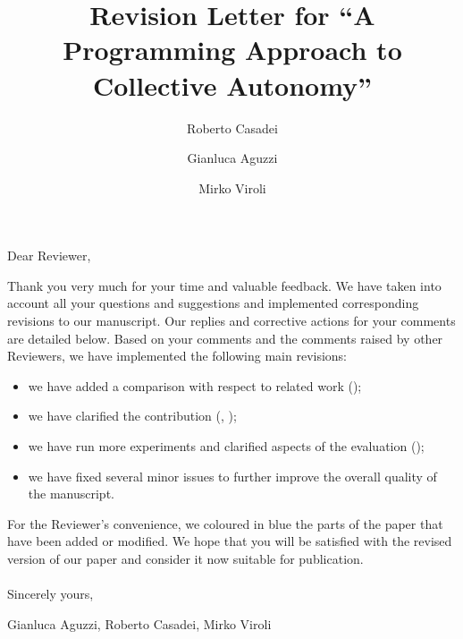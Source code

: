 \title{{\Large Revision Letter for} ``A Programming Approach to Collective Autonomy''}
\author{
Roberto Casadei
\and
Gianluca Aguzzi
\and
Mirko Viroli
}

\maketitle

Dear Reviewer, \newline

Thank you very much for your time and valuable feedback.
%
We have taken into account all your questions and suggestions and implemented corresponding revisions to our manuscript.
%
Our replies and corrective actions for your comments are detailed below.
%
Based on your comments and the comments raised by other Reviewers, we have implemented the following main revisions:
%
\begin{itemize}
\item we have added a comparison with respect to related work ();
\item we have clarified the contribution
(, );
\item we have run more experiments and clarified aspects of the evaluation ();
\item we have fixed several minor issues to further improve the overall quality of the manuscript.
\end{itemize}
%
For the Reviewer's convenience, we coloured in {\color{blue}blue} the parts of the paper that have been added or modified.
%
We hope that you will be satisfied with the revised version of our paper and consider it now suitable for publication.
\\ ~ \\

\noindent Sincerely yours,

Gianluca Aguzzi, Roberto Casadei, Mirko Viroli